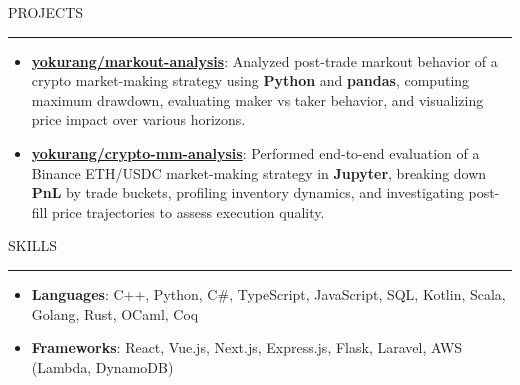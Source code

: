 \documentclass[letterpaper, 11pt]{article}
\def\sectionlineskip{\medskip}
\def\sectionskip{\medskip}
\def \entryspacing {-0pt}
\newcommand{\SectionHeading}[1]{
  \sectionskip
  \raggedright\raggedbottom\MakeUppercase{\large{#1}}
  \sectionlineskip
  \hrule
  \color{black}
}
\newcommand{\ResumeItem}[2]{
  \item{
    \textbf{#1}{: #2 \vspace{-2.835pt}}
  }
}
\newcommand{\ResumeProjectItem}[3]{
  \item{
    \href{#2}{\textbf{#1}}{: #3 \vspace{-2.835pt}}
  }
}
\newcommand{\ResumeEntryStart}{\begin{itemize}[leftmargin=0mm, label={}]}
\newcommand{\ResumeEntryEnd}{\end{itemize}\vspace{-2.835pt}} %
\newcommand{\ProjectItemListStart}{\begin{itemize}[leftmargin=*, label=$\bullet$]}
\newcommand{\ProjectItemListEnd}{\end{itemize}\vspace{\entryspacing}}
\begin{document}
  \SectionHeading{Projects}
  \ProjectItemListStart
  \ResumeProjectItem{yokurang/markout-analysis}
    {https://github.com/yokurang/markout-analysis}
    {Analyzed post-trade markout behavior of a crypto market-making strategy using \textbf{Python} and \textbf{pandas}, computing maximum drawdown, evaluating maker vs taker behavior, and visualizing price impact over various horizons.}

  \ResumeProjectItem{yokurang/crypto-mm-analysis}
    {https://github.com/yokurang/crypto-mm-analysis}
    {Performed end-to-end evaluation of a Binance ETH/USDC market-making strategy in \textbf{Jupyter}, breaking down \textbf{PnL} by trade buckets, profiling inventory dynamics, and investigating post-fill price trajectories to assess execution quality.}
  \ProjectItemListEnd

  \SectionHeading{Skills}
  \ResumeEntryStart
    \ResumeItem{Languages}{ C++, Python, C\#, TypeScript, JavaScript, SQL, Kotlin, Scala, Golang, Rust, OCaml, Coq }
    \ResumeItem{Frameworks}{ React, Vue.js, Next.js, Express.js, Flask, Laravel, AWS (Lambda, DynamoDB) }
  \ResumeEntryEnd
\end{document}
